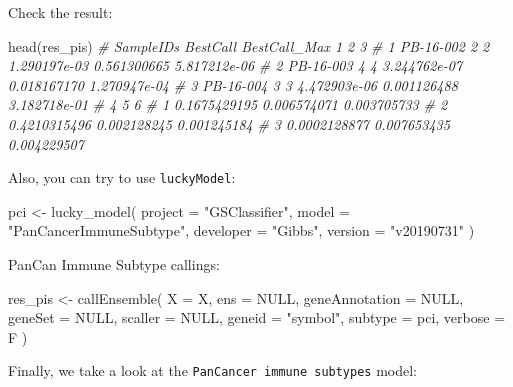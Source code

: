\documentclass[
  12pt,
]{book}
\newenvironment{Shaded}{\begin{snugshade}}{\end{snugshade}}
\newcommand{\AttributeTok}[1]{\textcolor[rgb]{0.77,0.63,0.00}{#1}}
\newcommand{\CommentTok}[1]{\textcolor[rgb]{0.56,0.35,0.01}{\textit{#1}}}
\newcommand{\ConstantTok}[1]{\textcolor[rgb]{0.00,0.00,0.00}{#1}}
\newcommand{\FunctionTok}[1]{\textcolor[rgb]{0.00,0.00,0.00}{#1}}
\newcommand{\NormalTok}[1]{#1}
\newcommand{\OtherTok}[1]{\textcolor[rgb]{0.56,0.35,0.01}{#1}}
\newcommand{\StringTok}[1]{\textcolor[rgb]{0.31,0.60,0.02}{#1}}
\begin{document}
Check the result:

\begin{Shaded}
\begin{Highlighting}[]
\FunctionTok{head}\NormalTok{(res\_pis)}
\CommentTok{\#   SampleIDs BestCall BestCall\_Max            1           2            3}
\CommentTok{\# 1 PB{-}16{-}002        2            2 1.290197e{-}03 0.561300665 5.817212e{-}06}
\CommentTok{\# 2 PB{-}16{-}003        4            4 3.244762e{-}07 0.018167170 1.270947e{-}04}
\CommentTok{\# 3 PB{-}16{-}004        3            3 4.472903e{-}06 0.001126488 3.182718e{-}01}
\CommentTok{\#              4           5           6}
\CommentTok{\# 1 0.1675429195 0.006574071 0.003705733}
\CommentTok{\# 2 0.4210315496 0.002128245 0.001245184}
\CommentTok{\# 3 0.0002128877 0.007653435 0.004229507}
\end{Highlighting}
\end{Shaded}

Also, you can try to use \texttt{luckyModel}:

\begin{Shaded}
\begin{Highlighting}[]
\NormalTok{pci }\OtherTok{\textless{}{-}} \FunctionTok{lucky\_model}\NormalTok{(}
  \AttributeTok{project =} \StringTok{"GSClassifier"}\NormalTok{,}
  \AttributeTok{model =} \StringTok{"PanCancerImmuneSubtype"}\NormalTok{,}
  \AttributeTok{developer =} \StringTok{"Gibbs"}\NormalTok{,}
  \AttributeTok{version =} \StringTok{"v20190731"}
\NormalTok{)}
\end{Highlighting}
\end{Shaded}

PanCan Immune Subtype callings:

\begin{Shaded}
\begin{Highlighting}[]
\NormalTok{res\_pis }\OtherTok{\textless{}{-}} \FunctionTok{callEnsemble}\NormalTok{(}
    \AttributeTok{X =}\NormalTok{ X,}
    \AttributeTok{ens =} \ConstantTok{NULL}\NormalTok{,}
    \AttributeTok{geneAnnotation =} \ConstantTok{NULL}\NormalTok{,}
    \AttributeTok{geneSet =} \ConstantTok{NULL}\NormalTok{,}
    \AttributeTok{scaller =} \ConstantTok{NULL}\NormalTok{,}
    \AttributeTok{geneid =} \StringTok{"symbol"}\NormalTok{,}
    \AttributeTok{subtype =}\NormalTok{ pci,}
    \AttributeTok{verbose =}\NormalTok{ F}
\NormalTok{  )}
\end{Highlighting}
\end{Shaded}

Finally, we take a look at the \texttt{PanCancer\ immune\ subtypes} model:
\end{document}
